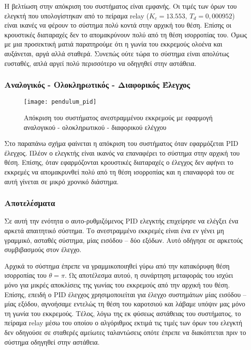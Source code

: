 Η βελτίωση στην απόκριση του συστήματος είναι εμφανής. Οι τιμές των όρων του ελεγκτή που υπολογίστηκαν από το πείραμα relay ($K_c = 13.553,\ T_d = 0,000952$) είναι ικανές να φέρουν το σύστημα πολύ κοντά στην αρχική του θέση. Επίσης οι κρουστικές διαταραχές δεν το απομακρύνουν πολύ από τη θέση ισορροπίας του. Όμως με μια προσεκτική ματιά παρατηρούμε ότι η γωνία του εκκρεμούς ολοένα και αυξάνεται, αργά αλλά σταθερά. Συνεπώς ούτε τώρα το σύστημα είναι απολύτως ευσταθές, απλά αργεί πολύ περισσότερο να οδηγηθεί στην αστάθεια.

\subsubsection{Αναλογικός - Ολοκληρωτικός - Διαφορικός Έλεγχος}

\begin{figure}[h]
  \centering
  \texttt{[image: pendulum\_pid]}
  \caption{Απόκριση του συστήματος ανεστραμμένου εκκρεμούς με εφαρμογή αναλογικού - ολοκληρωτικού - διαφορικού ελέγχου}
  \label{fig:pendulum_pid}
\end{figure}

Στο παραπάνω σχήμα φαίνεται η απόκριση του συστήματος όταν εφαρμόζεται PID έλεγχος. Πλέον ο ελεγκτής είναι ικανός να επαναφέρει το σύστημα στην αρχική του θέση. Επίσης, όταν εφαρμόζονται κρουστικές διαταραχές ο έλεγχος δεν αφήνει το εκκρεμές να απομακρυνθεί πολύ από τη θέση ισορροπίας και η επαναφορά του σε αυτή γίνεται σε μικρό χρονικό διάστημα. 

\subsubsection{Αποτελέσματα}

Σε αυτή την ενότητα ο αυτο-ρυθμιζόμενος PID ελεγκτής επιχείρησε να ελέγξει ένα αρκετά απαιτητικό σύστημα. Το ανεστραμμένο εκκρεμές είναι ένα εν γένει μη γραμμικό, ασταθές σύστημα, μίας εισόδου -- δύο εξόδων. Αυτό οδήγησε σε αρκετούς συμβιβασμούς στον έλεγχο.

Αρχικά το σύστημα έπρεπε να γραμμικοποιηθεί γύρω από την κατακόρυφη θέση ισορροπίας του $\theta = \pi$. Ως αποτέλεσμα αυτού, η συνάρτηση μεταφοράς του ισχύει μόνο για μικρές αποκλίσεις της γωνίας του εκκρεμούς από την αρχική του θέση. Επίσης, επειδή ο PID έλεγχος χρησιμοποιείται για έλεγχο συστημάτων μίας εισόδου -- μίας εξόδου, αγνοήσαμε εντελώς τη θέση του καροτσιού και λάβαμε υπόψιν μας μόνο τη γωνία του εκκρεμούς. Τέλος, λόγω της εκ φύσεως αστάθειας του συστήματος, το πείραμα relay μέσω του οποίου ο αλγόριθμος εκτιμά τις τιμές των όρων του ελεγκτή δεν οδηγούσε σε σταθερές αμείωτες ταλαντώσεις οπότε έπρεπε να διακόπτεται πριν το σύστημα οδηγηθεί στην αστάθεια. 


